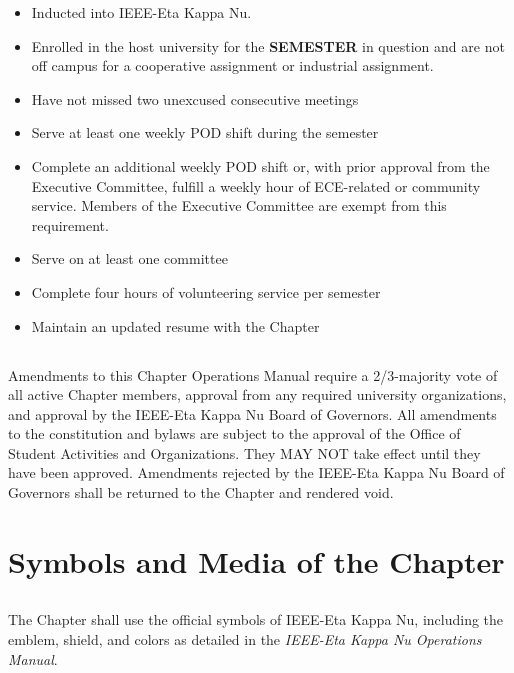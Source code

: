 \documentclass[10pt, oneside]{article}
\begin{document}
\begin{itemize}
    \item Inducted into IEEE-Eta Kappa Nu.
    \item Enrolled in the host university for the \textbf{SEMESTER} in question and are not off campus for a cooperative assignment or industrial assignment.
    \item Have not missed two unexcused consecutive meetings
    \item Serve at least one weekly POD shift during the semester
    \item Complete an additional weekly POD shift or, with prior approval from the Executive Committee, fulfill a weekly hour of ECE-related or community service. Members of the Executive Committee are exempt from this requirement.

    \item Serve on at least one committee
    \item Complete four hours of volunteering service per semester
    \item Maintain an updated resume with the Chapter
\end{itemize}

\subsection{}
Amendments to this Chapter Operations Manual require a 2/3-majority vote of all active Chapter members, approval from any required university organizations, and approval by the IEEE-Eta Kappa Nu Board of Governors. All amendments to the constitution and bylaws are subject to the approval of the Office of Student
Activities and Organizations. They MAY NOT take effect until they have been approved. Amendments rejected by the IEEE-Eta Kappa Nu Board of Governors shall be returned to the Chapter and rendered void.

\section{Symbols and Media of the Chapter}
\subsection{}

The Chapter shall use the official symbols of IEEE-Eta Kappa Nu, including the emblem, shield, and colors as detailed in the \textit{IEEE-Eta Kappa Nu Operations Manual}.
\end{document}
